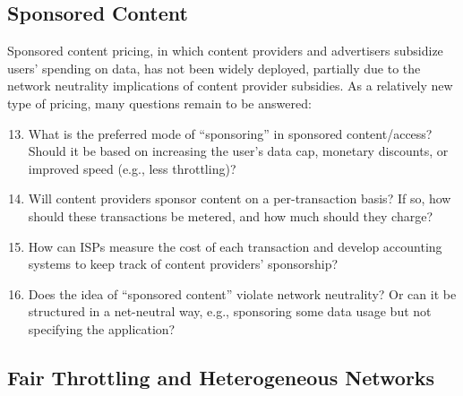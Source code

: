 \subsection{Sponsored Content}

Sponsored content pricing, in which content providers and advertisers subsidize users' spending on data, has not been widely deployed, partially due to the network neutrality implications of content provider subsidies. As a relatively new type of pricing, many questions remain to be answered:
\begin{enumerate}
\setcounter{enumi}{12}
\item
What is the preferred mode of ``sponsoring'' in sponsored content/access? Should it be based on increasing the user's data cap, monetary discounts, or improved speed (e.g., less throttling)?
\item
Will content providers sponsor content on a per-transaction basis? If so, how should these transactions be metered, and how much should they charge?
\item
How can ISPs measure the cost of each transaction and develop accounting systems to keep track of content providers' sponsorship?
\item
Does the idea of ``sponsored content'' violate network neutrality? Or can it be structured in a net-neutral way, e.g., sponsoring some data usage but not specifying the application?
\end{enumerate}

\subsection{Fair Throttling and Heterogeneous Networks}

